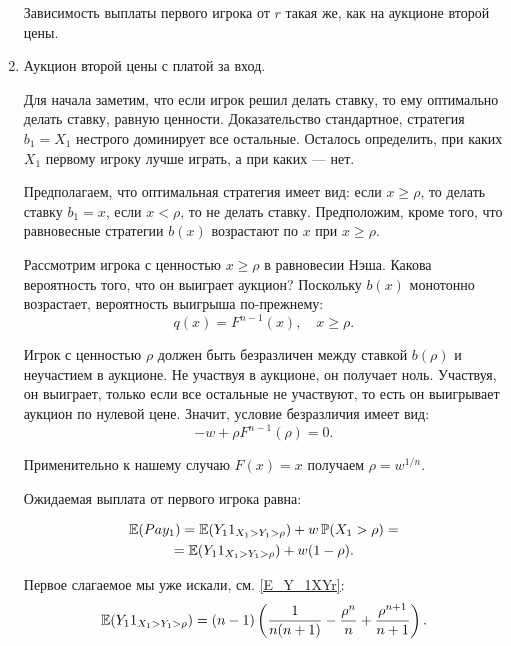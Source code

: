 \begin{enumerate}
Зависимость выплаты первого игрока от $ r $ такая же, как на аукционе второй цены.


\item Аукцион второй цены с платой за вход.


Для начала заметим, что если игрок решил делать ставку, то ему оптимально делать ставку, равную ценности. Доказательство стандартное, стратегия $ b_{1}=X_{1} $ нестрого доминирует все остальные. Осталось определить, при каких $ X_{1} $ первому игроку лучше играть, а при каких  — нет.

Предполагаем, что оптимальная стратегия имеет вид: если $ x\geq \rho $, то делать ставку $ b_{1}=x $, если $ x<\rho $, то не делать ставку. Предположим, кроме того, что равновесные стратегии $ b(x) $ возрастают по $ x $ при $ x\geq \rho $.

Рассмотрим игрока с ценностью $ x\geq \rho $ в равновесии Нэша. Какова вероятность того, что он выиграет аукцион? Поскольку $ b(x) $ монотонно возрастает, вероятность выигрыша по-прежнему:
\begin{equation}
q(x)=F^{n-1}(x),\quad x\geq \rho.
\end{equation}

Игрок с ценностью $ \rho $ должен быть безразличен между ставкой $ b(\rho) $ и неучастием в аукционе. Не участвуя в аукционе, он получает ноль. Участвуя, он выиграет, только если все остальные не участвуют, то есть он выигрывает аукцион по нулевой цене. Значит, условие безразличия имеет вид:
\begin{equation}
-w+\rho F^{n-1}(\rho)=0.
\end{equation}

Применительно к нашему случаю $ F(x)=x $ получаем $ \rho=w^{1/n} $.


Ожидаемая выплата от первого игрока равна:

\begin{multline}
\operatorname{\mathbb{E}}(Pay_{1})=\operatorname{\mathbb{E}}(Y_{1}1_{X_{1}>Y_{1}>\rho})+w\operatorname{\mathbb{P}}(X_{1}>\rho)=\\
=\operatorname{\mathbb{E}}(Y_{1}1_{X_{1}>Y_{1}>\rho})+w(1-\rho).
\end{multline}

Первое слагаемое мы уже искали, см. \ref{E_Y_1XYr}:
\begin{equation}
\operatorname{\mathbb{E}}(Y_{1}1_{X_{1}>Y_{1}>\rho})=(n-1)\left(\frac{1}{n(n+1)}-\frac{\rho^{n}}{n}+\frac{\rho^{n+1}}{n+1}\right).
\end{equation}


\end{enumerate}
